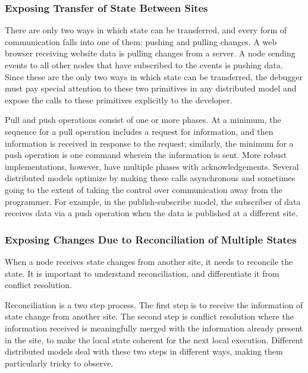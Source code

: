 \subsubsection{Exposing Transfer of State Between Sites}
There are only two ways in which state can be transferred, and every form of communication falls into one of them: pushing and pulling changes. A web browser receiving website data is pulling changes from a server. A node sending events to all other nodes that have subscribed to the events is pushing data. Since these are the only two ways in which state can be transferred, the debugger must pay special attention to these two primitives in any distributed model and expose the calls to these primitives explicitly to the developer. 

Pull and push operations consist of one or more phases. At a minimum, the sequence for a pull operation includes a request for information, and then information is received in response to the request; similarly, the minimum for a push operation is one command wherein the information is sent. More robust implementations, however, have multiple phases with acknowledgements. Several distributed models optimize by making these calls asynchronous and sometimes going to the extent of taking the control over communication away from the programmer. For example, in the publish-subscribe model, the subscriber of data receives data via a push operation when the data is published at a different site. 

\subsubsection{Exposing Changes Due to Reconciliation of Multiple States}
\label{subsubsec:recon}
When a node receives state changes from another site, it needs to reconcile the state. It is important to understand reconciliation, and differentiate it from conflict resolution. 

Reconciliation is a two step process. The first step is to receive the information of state change from another site. The second step is conflict resolution where the information received is meaningfully merged with the information already present in the site, to make the local state coherent for the next local execution. Different distributed models deal with these two steps in different ways, making them particularly tricky to observe. 

